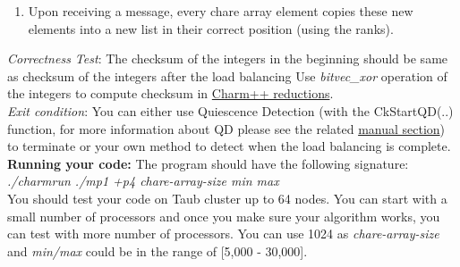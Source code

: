 \documentclass{article}
\begin{document}
\begin{enumerate}

\item Upon receiving a message, every chare array element copies these new
elements into a new list in their correct position (using the ranks).
 
\end{enumerate}

\emph{Correctness Test}: The checksum of the integers in the beginning
should be same as checksum of the integers after the load balancing
Use \emph{bitvec\_xor} operation of the integers to compute checksum in  \href{http://charm.cs.uiuc.edu/manuals/html/charm++/4.html#SECTION01361000000000000000}{ Charm++
reductions}. \\

\emph{Exit condition}: You can either use Quiescence Detection (with the CkStartQD(..) function, for more
information about QD please see the related
\href{http://charm.cs.illinois.edu/manuals/html/charm++/12.html#SECTION02350000000000000000}{manual
section}) to terminate or your own method to detect when
the load balancing is complete. \\


\textbf{Running your code:}
The program should have the following signature: \\
\textit{./charmrun ./mp1 +p4 chare-array-size min max} \\

You should test your code on Taub cluster up to 64 nodes. You can start with a small
number of processors and once you make sure your algorithm works, you can test
with more number of processors. You can use 1024 as
\textit{chare-array-size} and \textit{min/max} could be in the range of [5,000 - 30,000].
\\ \\ \\

\end{document}

